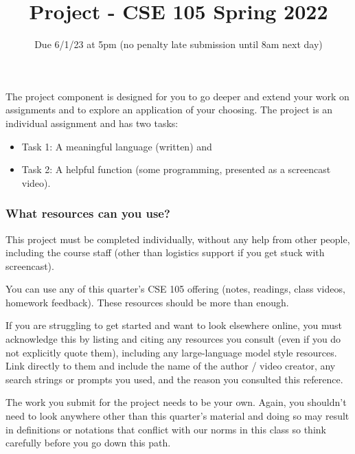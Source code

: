 
\titleformat{\subsubsection}[runin]
   {\normalfont\bfseries}{}{}{}
   
\title{Project - CSE 105 Spring 2022}
\date{Due 6/1/23 at 5pm (no penalty late submission until 8am next day)}


\maketitle

\thispagestyle{fancy}

The project component is designed for you to go deeper and extend your work on assignments 
and to explore an application of your choosing. 
The project is an individual assignment and has 
two tasks: 
\begin{itemize}
    \item Task 1: A meaningful language (written) and \item Task 2: A helpful function (some programming, presented as a screencast video).
\end{itemize}
\vspace{-20pt}


\subsubsection*{What resources can you use?}
This project must be completed individually, without any help from other people, 
including the course staff (other than logistics support if you get stuck with screencast). 

You can use any of this quarter's CSE 105 offering (notes, readings, class videos, homework feedback). 
These resources should be more than enough. 

If you are struggling to get started and want to 
look elsewhere online, you must acknowledge this by listing and 
citing any resources you consult 
(even if you do not explicitly quote them), including any large-language model style resources. 
Link directly to them and include the name of the 
author / video creator, any search strings or prompts you used, and the reason you consulted this reference. 

The work you submit for 
the project needs to be your own. Again, you shouldn't need to look anywhere other 
than this quarter's material and doing so may result in definitions or notations 
that conflict with our norms in this class so think carefully before you go down this path.

